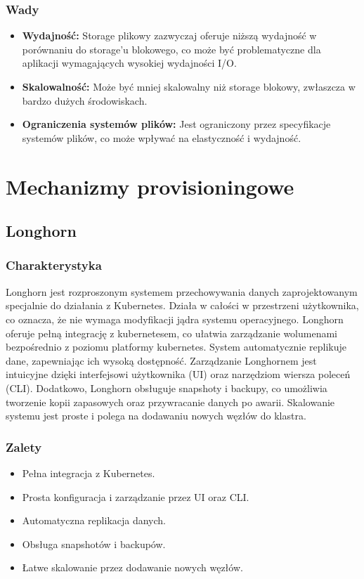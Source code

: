 \documentclass[polish,envcountsect,10pt]{article}
\begin{document}
\subsubsection{Wady}
\begin{itemize}
    \item \textbf{Wydajność:} Storage plikowy zazwyczaj oferuje niższą wydajność w porównaniu do storage'u blokowego, co może być problematyczne dla aplikacji wymagających wysokiej wydajności I/O.
    \item \textbf{Skalowalność:} Może być mniej skalowalny niż storage blokowy, zwłaszcza w bardzo dużych środowiskach.
    \item \textbf{Ograniczenia systemów plików:} Jest ograniczony przez specyfikacje systemów plików, co może wpływać na elastyczność i wydajność.
\end{itemize}

\section{Mechanizmy provisioningowe}

\subsection{Longhorn}

\subsubsection{Charakterystyka}

Longhorn jest rozproszonym systemem przechowywania danych zaprojektowanym specjalnie do działania z Kubernetes. Działa w całości w przestrzeni użytkownika, co oznacza, że nie wymaga modyfikacji jądra systemu operacyjnego. Longhorn oferuje pełną integrację z kubernetesem, co ułatwia zarządzanie wolumenami bezpośrednio z poziomu platformy kubernetes. System automatycznie replikuje dane, zapewniając ich wysoką dostępność. Zarządzanie Longhornem jest intuicyjne dzięki interfejsowi użytkownika (UI) oraz narzędziom wiersza poleceń (CLI). Dodatkowo, Longhorn obsługuje snapshoty i backupy, co umożliwia tworzenie kopii zapasowych oraz przywracanie danych po awarii. Skalowanie systemu jest proste i polega na dodawaniu nowych węzłów do klastra.

\subsubsection{Zalety}
\begin{itemize}
    \item Pełna integracja z Kubernetes.
    \item Prosta konfiguracja i zarządzanie przez UI oraz CLI.
    \item Automatyczna replikacja danych.
    \item Obsługa snapshotów i backupów.
    \item Łatwe skalowanie przez dodawanie nowych węzłów.
\end{itemize}
\end{document}
